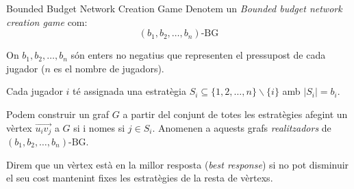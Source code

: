 \documentclass[aspectratio=169,handout]{beamer}
\begin{document}
\begin{frame}{Bounded Budget Network Creation Game}
    Denotem un \emph{Bounded budget network creation game} com:
    $$ (b_1, b_2, \dots , b_n)\text{-BG} $$
    
    On $b_1,b_2, \dots , b_n$ són enters no negatius que representen el pressupost de cada jugador ($n$ es el nombre de jugadors).
    
    \vspace{1em}
    
    Cada jugador $i$ té assignada una estratègia $S_i \subseteq \{1, 2, \dots , n\} \backslash \{i\}$ amb
    $|S_i| = b_i$.
    
    \vspace{1em}
    
    Podem construir un graf $G$ a partir del conjunt de totes les estratègies afegint un vèrtex $\overrightarrow{u_iv_j}$
    a $G$ si i nomes si $j \in S_i$. Anomenen a aquests grafs \emph{realitzadors} de
    $ (b_1, b_2, \dots , b_n)\text{-BG} $.
    
    \vspace{1em}
    
    Direm que un vèrtex està en la millor resposta (\emph{best response}) si no pot disminuir el seu
    cost mantenint fixes les estratègies de la resta de vèrtexs.
\end{frame}
\end{document}
